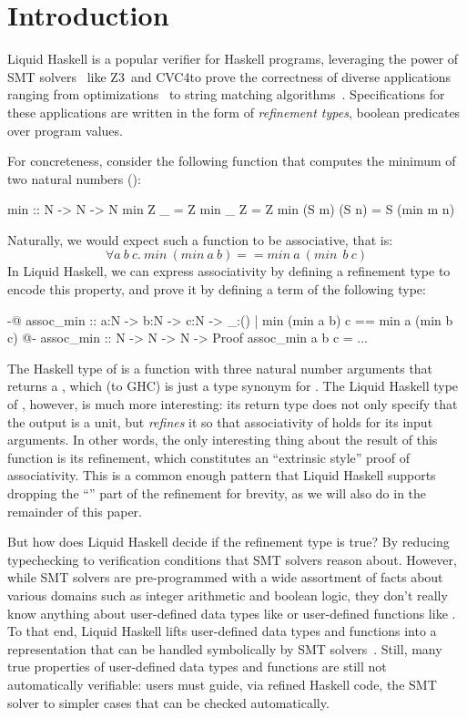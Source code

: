 \section{Introduction}

Liquid Haskell\cite{liquidHaskell} is a popular verifier for Haskell
programs, leveraging the power of SMT solvers~\cite{BarST-RR-10} like
Z3~\cn and CVC4\cn to prove the correctness of diverse applications
ranging from optimizations~\cite{TPE2018} to string matching
algorithms~\cite{TaleOfTwoProvers}. Specifications for these
applications are written in the form of {\em refinement
  types}\cite{RefinementForML}, boolean predicates over program
values.

For concreteness, consider the following  function that
computes the minimum of two natural numbers ():
\begin{code}
  min :: N -> N -> N 
  min Z _ = Z
  min _ Z = Z
  min (S m) (S n) = S (min m n)
\end{code}

\newcommand{\imin}{\textit{min}~}
Naturally, we would expect such a function to be associative, that is:
$$ \forall a ~ b ~ c. ~ \imin (\imin a~b) == \imin a~(\imin~b~c) $$
%
In Liquid Haskell, we can express associativity by defining a
refinement type to encode this property, and prove it by defining
a term of the following type:
%
\begin{code}
  {-@ assoc_min :: a:N -> b:N -> c:N ->
      {_:() | min (min a b) c == min a (min b c)}
  @-}
  assoc_min :: N -> N -> N -> Proof
  assoc_min a b c = ...
\end{code}
%
The Haskell type of  is a function with three natural
number arguments that returns a , which (to GHC) is just a
type synonym for \LC{()}. The Liquid Haskell type of ,
however, is much more interesting: its return type does not only
specify that the output is a unit, but {\em refines} it so that
associativity of  holds for its input arguments. In other
words, the only interesting thing about the result of this function
is its refinement, which constitutes an ``extrinsic style'' proof
of associativity. This is a common enough pattern that Liquid Haskell
supports dropping the ``\LC{_:()}'' part of the refinement for brevity,
as we will also do in the remainder of this paper.

But how does Liquid Haskell decide if the refinement type is true? By
reducing typechecking to verification conditions that SMT solvers
reason about. However, while SMT solvers are pre-programmed with a
wide assortment of facts about various domains such as integer
arithmetic and boolean logic, they don't really know anything about
user-defined data types like  or user-defined functions like
. To that end, Liquid Haskell lifts user-defined data types
and functions into a representation that can be handled symbolically
by SMT solvers~\cite{VazouTCSNWJ18}. Still, many true properties of
user-defined data types and functions are still not automatically
verifiable: users must guide, via refined Haskell code, the SMT solver
to simpler cases that can be checked automatically.

